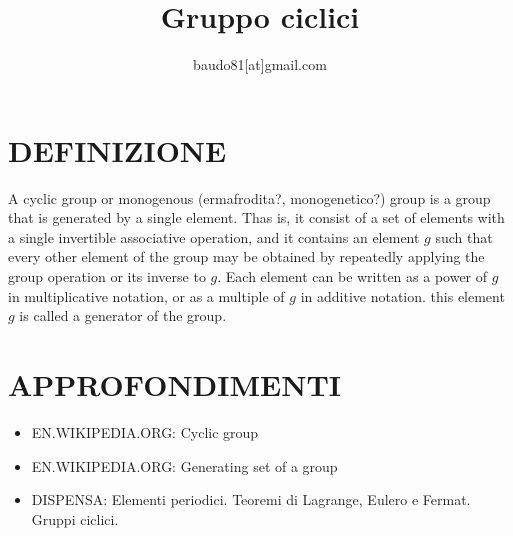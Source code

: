 \documentclass[a4paper,10pt]{article}
\title{Gruppo ciclici}
\author{baudo81[at]gmail.com}
\begin{document}
\maketitle

\section{DEFINIZIONE}
A cyclic group or monogenous (ermafrodita?, monogenetico?) group is a group that is generated by a single element. Thas is, it consist
of a set of elements with a single invertible associative operation, and it contains an element $g$ such that every other element
of the group may be obtained by repeatedly applying the group operation or its inverse to $g$. Each element can be written as a power
of $g$ in multiplicative notation, or as a multiple of $g$ in additive notation. this element $g$ is called a generator of the group. \cite{cyclicgroup1}

\section{APPROFONDIMENTI}
\begin{itemize}
 \item EN.WIKIPEDIA.ORG: Cyclic group \cite{cyclicgroup1}
 \item EN.WIKIPEDIA.ORG: Generating set of a group \cite{cyclicgroup2}
 \item DISPENSA: Elementi periodici. Teoremi di Lagrange, Eulero e Fermat. Gruppi ciclici. \cite{cyclicgroup3}
\end{itemize}



\end{document}
